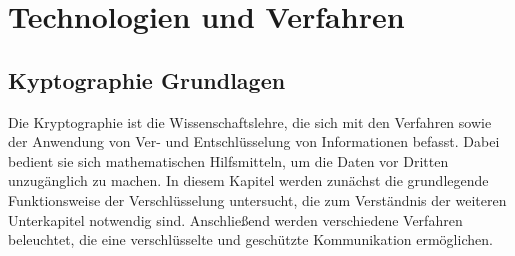 \documentclass  [paper=a4,
				fontsize=12pt,
				listof=totoc,
				bibliography=totoc
				]{scrreprt}
\begin{document}
	
	\chapter{Technologien und Verfahren}
		\section{Kyptographie Grundlagen}
				Die Kryptographie ist die Wissenschaftslehre, die sich mit den Verfahren sowie der Anwendung von Ver- und Entschlüsselung von Informationen befasst. Dabei bedient sie sich mathematischen Hilfsmitteln, um die Daten vor Dritten unzugänglich zu machen. In diesem Kapitel werden zunächst die grundlegende Funktionsweise der Verschlüsselung untersucht, die zum Verständnis der weiteren Unterkapitel notwendig sind. Anschließend werden verschiedene Verfahren beleuchtet, die eine verschlüsselte und geschützte Kommunikation ermöglichen.
\end{document}
